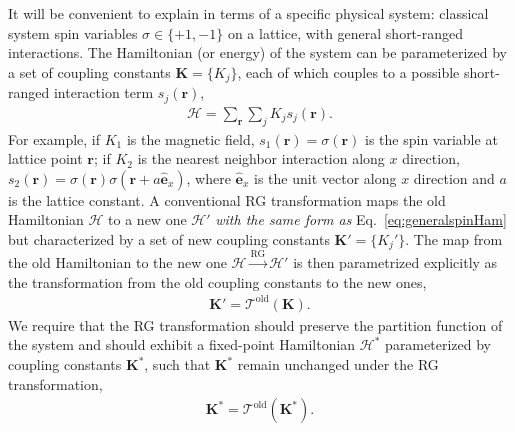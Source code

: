 \documentclass[aps,prb,reprint,superscriptaddress,floatfix]{revtex4-2}
\begin{document}
It will be convenient to explain in terms of a specific physical system: classical system spin variables $\sigma \in \{+1, -1\}$ on a lattice, with general short-ranged interactions.
The Hamiltonian (or energy) of the system can be parameterized by a set of coupling constants $\mathbf{K} = \{K_j\}$, each of which couples to a possible short-ranged interaction term $s_j(\mathbf{r})$,
%
\begin{align}\label{eq:generalspinHam}
    \mathcal{H} = \sum_{\mathbf{r}} \sum_{j} K_j s_j(\mathbf{r}).
\end{align}
%
For example, if $K_1$ is the magnetic field, $s_1(\mathbf{r}) = \sigma(\mathbf{r})$ is the spin variable at lattice point $\mathbf{r}$; if $K_2$ is the nearest neighbor interaction along $x$ direction, $s_2(\mathbf{r}) = \sigma(\mathbf{r})\sigma(\mathbf{r} + a\hat{\mathbf{e}}_x)$, where $\hat{\mathbf{e}}_x$ is the unit vector along $x$ direction and $a$ is the lattice constant. 
A conventional RG transformation maps the old Hamiltonian $\mathcal{H}$ to a new one $\mathcal{H}'$ \textit{with the same form as} Eq.~\eqref{eq:generalspinHam} but characterized by a set of new coupling constants $\mathbf{K}' = \{ K_j'\}$. 
The map from the old Hamiltonian to the new one $\mathcal{H} \xrightarrow{\text{RG}} \mathcal{H}'$ is then parametrized explicitly as the transformation from the old coupling constants to the new ones,
%
\begin{align}\label{eq:oldRGK}
    \mathbf{K}' = \mathcal{T}^{\text{old}}\left(\mathbf{K}\right).
\end{align}
%
We require that the RG transformation should preserve the partition function of the system and should exhibit a fixed-point Hamiltonian $\mathcal{H}^{*}$ parameterized by coupling constants $\mathbf{K}^{*}$, such that $\mathbf{K}^{*}$ remain unchanged under the RG transformation,
%
\begin{align}\label{eq:oldRGKstar}
    \mathbf{K}^{*} =
    \mathcal{T}^{\text{old}}\left(\mathbf{K}^{*}\right).
\end{align}
%
\end{document}

